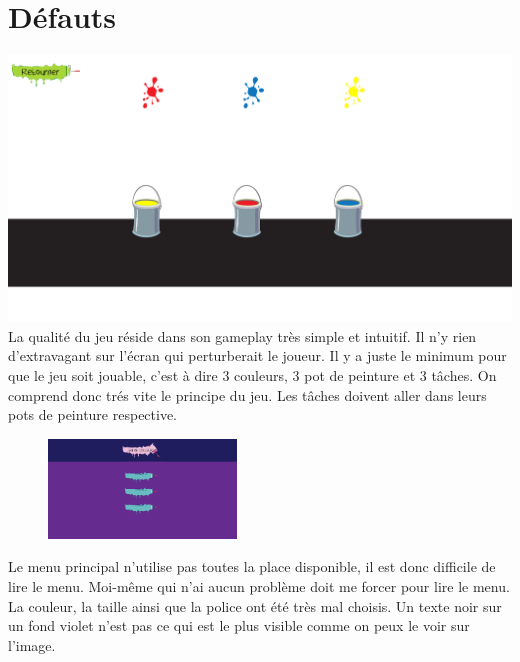 \documentclass{article}
\begin{document}
\newpage

\section{D\'efauts}


\vspace{0.5cm}
\includegraphics[width=\textwidth]{4}\\
\hspace*{0.6cm}La qualit\'e du jeu r\'eside dans son gameplay tr\`es simple et intuitif. Il n'y rien d'extravagant sur l'\'ecran qui perturberait le joueur. Il y a juste le minimum pour que le jeu soit jouable, c'est \`a dire 3 couleurs, 3 pot de peinture et 3 t\^aches. On comprend donc tr\'es vite le principe du jeu. Les t\^aches doivent aller dans leurs pots de peinture respective.\\
\begin{figure}
\vspace{-13pt}
\centering
\includegraphics[width=5cm]{2}
\end{figure}
{\hspace*{0.6cm}Le menu principal n'utilise pas toutes la place disponible, il est donc difficile de lire le menu. Moi-m\^eme qui n'ai aucun probl\`eme doit me forcer pour lire le menu. La couleur, la taille ainsi que la police ont \'et\'e tr\`es mal choisis. Un texte noir sur un fond violet n'est pas ce qui est le plus visible comme on peux le voir sur l'image.}\\
\end{document}
